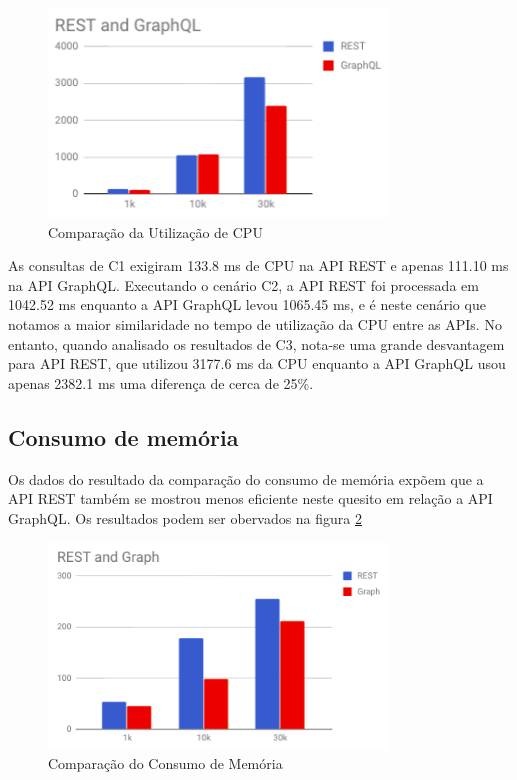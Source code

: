 \begin{figure}[htbp]
    \centering
    \includegraphics[width=0.8\textwidth]{figuras/q1-cpu.png}
    \caption{Comparação da Utilização de CPU}
    \label{fig:q1-cpu}
    \author{fonte: Autor}
\end{figure}

As consultas de C1 exigiram 133.8 ms de CPU na API REST e apenas 111.10 ms na API GraphQL. Executando o cenário C2, a API REST foi processada em 1042.52 ms enquanto a API GraphQL levou 1065.45 ms, e é neste cenário que notamos a maior similaridade no tempo de utilização da CPU entre as APIs. No entanto, quando analisado os resultados de C3, nota-se uma grande desvantagem para API REST, que utilizou 3177.6 ms da CPU enquanto a API GraphQL usou apenas 2382.1 ms uma diferença de cerca de 25\%.
    
\subsection{Consumo de memória}

Os dados do resultado da comparação do consumo de memória expõem que a API REST também se mostrou menos eficiente neste quesito em relação a API GraphQL. Os resultados podem ser obervados na figura \ref{fig:q1-mem}

\begin{figure}[htbp]
    \centering
    \includegraphics[width=0.8\textwidth]{figuras/q1-mem.png}
    \caption{Comparação do Consumo de Memória}
    \label{fig:q1-mem}
    \author{fonte: Autor}
\end{figure}

